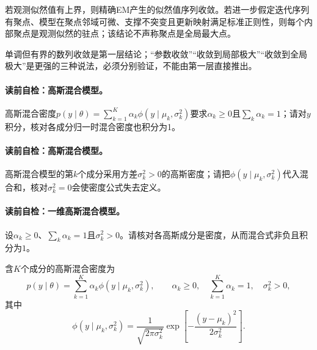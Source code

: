 \begin{theorem}[EM收敛结论的边界]\label{thm:V3-C04-convergence-scope}
若观测似然值有上界，则精确EM产生的似然值序列收敛。若进一步假定迭代序列有聚点、模型在聚点邻域可微、支撑不突变且更新映射满足标准正则性，则每个内部聚点是观测似然的驻点；该结论不声称聚点是全局最大点。
\end{theorem}

单调但有界的数列收敛是第一层结论；“参数收敛”“收敛到局部极大”“收敛到全局极大”是更强的三种说法，必须分别验证，不能由第一层直接推出。


\paragraph{读前自检：高斯混合模型。}高斯混合密度$ p(y\mid\theta)=\sum_{k=1}^K\alpha_k\phi(y\mid\mu_k,\sigma_k^2)$要求$\alpha_k\ge0$且$\sum_k\alpha_k=1$；请对$y$积分，核对各成分归一时混合密度也积分为1。\par
\paragraph{读前自检：高斯混合模型。}高斯混合模型的第$k$个成分采用方差$\sigma_k^2>0$的高斯密度；请把$\phi(y\mid\mu_k,\sigma_k^2)$代入混合和，核对$\sigma_k^2=0$会使密度公式失去定义。\par

\paragraph{读前自检：一维高斯混合模型。}设$\alpha_k\ge0$、$\sum_k\alpha_k=1$且$\sigma_k^2>0$。请核对各高斯成分是密度，从而混合式非负且积分为$1$。\par

\begin{definition}[一维高斯混合模型]\label{def:V3-C04-gmm}
含$K$个成分的高斯混合密度为
\[
p(y\mid\theta)=\sum_{k=1}^{K}\alpha_k\phi(y\mid\mu_k,\sigma_k^2),\qquad
\alpha_k\geq0,\quad\sum_{k=1}^{K}\alpha_k=1,\quad\sigma_k^2>0,
\]
其中
\[
\phi(y\mid\mu_k,\sigma_k^2)=\frac{1}{\sqrt{2\pi\sigma_k^2}}
\exp\!\left[-\frac{(y-\mu_k)^2}{2\sigma_k^2}\right].
\]
\end{definition}


